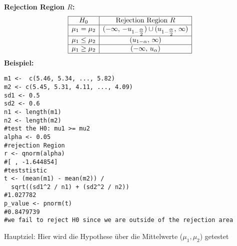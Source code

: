\large{\textbf{Rejection Region \(R\):}}
\[
\begin{array}{|c|c|}
\hline
H_0 & \text{Rejection Region } R \\ \hline
\mu_1 = \mu_2 
  & (-\infty,\,-u_{1-\tfrac{\alpha}{2}})\cup(u_{1-\tfrac{\alpha}{2}},\,\infty) \\ \hline
\mu_1 \leq \mu_2 
  & (u_{1-\alpha},\,\infty) \\ \hline
\mu_1 \geq \mu_2 
  & (-\infty,\,u_{\alpha}) \\ \hline
\end{array}
\]
\large{\textbf{Beispiel:}}
\begin{lstlisting} 
m1 <-  c(5.46, 5.34, ..., 5.82)
m2 <- c(5.45, 5.31, 4.11, ..., 4.09)
sd1 <- 0.5
sd2 <- 0.6
n1 <- length(m1)
n2 <- length(m2)
#test the H0: mu1 >= mu2
alpha <- 0.05
#rejection Region
r <- qnorm(alpha)
#[ , -1.644854]
#teststistic
t <- (mean(m1) - mean(m2)) / 
  sqrt((sd1^2 / n1) + (sd2^2 / n2))
#1.027782
p_value <- pnorm(t) 
#0.8479739
#we fail to reject H0 since we are outside of the rejection area
\end{lstlisting}
\columnbreak
\normalsize
\begin{center}
\normalsize
Hauptziel: Hier wird die Hypothese über die
Mittelwerte ($\mu_1, \mu_2$) getestet
\end{center}
\normalsize
\begin{center}
\end{center}

